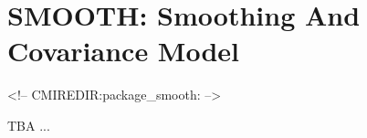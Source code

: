 \section{SMOOTH: Smoothing And Covariance Model}
\label{sec:pkg:smooth}
\begin{rawhtml}
<!-- CMIREDIR:package_smooth: -->
\end{rawhtml}

\noindent
TBA ...

